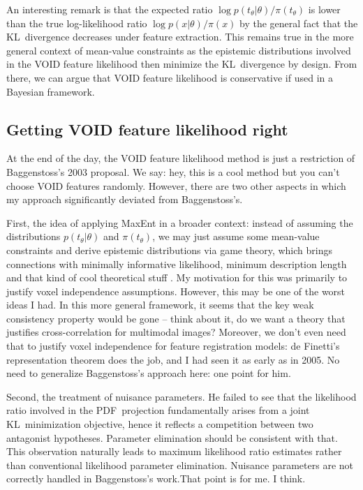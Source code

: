\documentclass[english]{scrartcl}
\begin{document}
An interesting remark is that the expected ratio $\log p(t_\theta|\theta)/\pi(t_\theta)$ is lower than the true log-likelihood ratio $\log p(x|\theta)/\pi(x)$ by the general fact that the KL~divergence decreases under feature extraction. This remains true in the more general context of mean-value constraints as the epistemic distributions involved in the VOID feature likelihood then minimize the KL~divergence by design. From there, we can argue that VOID feature likelihood is conservative if used in a Bayesian framework.


\subsection{Getting VOID feature likelihood right}

At the end of the day, the VOID feature likelihood method is just a restriction of Baggenstoss's 2003 proposal. We say: hey, this is a cool method but you can't choose VOID features randomly. However, there are two other aspects in which my approach significantly deviated from Baggenstoss's.

First, the idea of applying MaxEnt in a broader context: instead of assuming the distributions $p(t_\theta|\theta)$ and $\pi(t_\theta)$, we may just assume some mean-value constraints and derive epistemic distributions via game theory, which brings connections with minimally informative likelihood, minimum description length and that kind of cool theoretical stuff \cite{Grunwald-04,Grunwald-06}. My motivation for this was primarily to justify voxel independence assumptions. However, this may be one of the worst ideas I had. In this more general framework, it seems that the key weak consistency property would be gone -- think about it, do we want a theory that justifies cross-correlation for multimodal images? Moreover, we don't even need that to justify voxel independence for feature registration models: de Finetti's representation theorem does the job, and I had seen it as early as in 2005. No need to generalize Baggenstoss's approach here: one point for him.

Second, the treatment of nuisance parameters. He failed to see that the likelihood ratio involved in the PDF~projection fundamentally arises from a joint KL~minimization objective, hence it reflects a competition between two antagonist hypotheses. Parameter elimination should be consistent with that. This observation naturally leads to maximum likelihood ratio estimates rather than conventional likelihood parameter elimination. Nuisance parameters are not correctly handled in Baggenstoss's work.That point is for me. I think.










\end{document}
